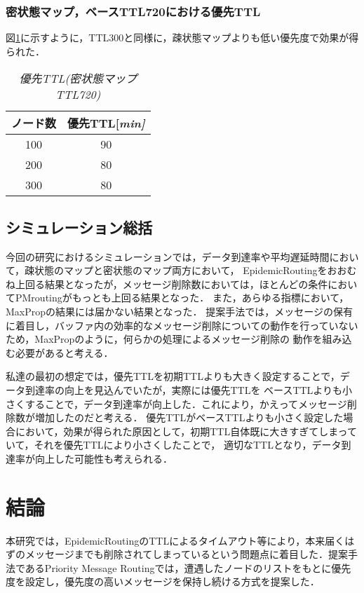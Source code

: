 \documentclass[11pt]{icsthesis}
\begin{document}
\subsection{密状態マップ，ベースTTL720における優先TTL}
図\ref{priorityTTL_kamitsu720}に示すように，TTL300と同様に，疎状態マップよりも低い優先度で効果が得られた．
\begin{table}[H]
	\begin{center}
			 \caption[]{\it{優先TTL(密状態マップ TTL720)}}
			 \label{priorityTTL_kamitsu720}
			 \begin{tabular}{|c|c|}
 \hline
 ノード数&優先TTL[\it{min}]\\
 \hline
 100&90\\
 \hline
 200&80\\
 \hline
 300&80\\
 \hline
			 \end{tabular}
		 \end{center}
 \end{table}
 \section{シミュレーション総括}
 今回の研究におけるシミュレーションでは，データ到達率や平均遅延時間において，疎状態のマップと密状態のマップ両方において，
 EpidemicRoutingをおおむね上回る結果となったが，メッセージ削除数においては，ほとんどの条件においてPMroutingがもっとも上回る結果となった．
 また，あらゆる指標において，MaxPropの結果には届かない結果となった．
 提案手法では，メッセージの保有に着目し，バッファ内の効率的なメッセージ削除についての動作を行っていないため，MaxPropのように，何らかの処理によるメッセージ削除の
 動作を組み込む必要があると考える．
 
 
 私達の最初の想定では，優先TTLを初期TTLよりも大きく設定することで，データ到達率の向上を見込んでいたが，実際には優先TTLを
 ベースTTLよりも小さくすることで，データ到達率が向上した．これにより，かえってメッセージ削除数が増加したのだと考える．
 優先TTLがベースTTLよりも小さく設定した場合において，効果が得られた原因として，初期TTL自体既に大きすぎてしまっていて，それを優先TTLにより小さくしたことで，
適切なTTLとなり，データ到達率が向上した可能性も考えられる． 
\newpage
\chapter{結論}
本研究では，EpidemicRoutingのTTLによるタイムアウト等により，本来届くはずのメッセージまでも削除されてしまっているという問題点に着目した．提案手法であるPriority Message Routingでは，遭遇したノードのリストをもとに優先度を設定し，優先度の高いメッセージを保持し続ける方式を提案した．
\end{document}
